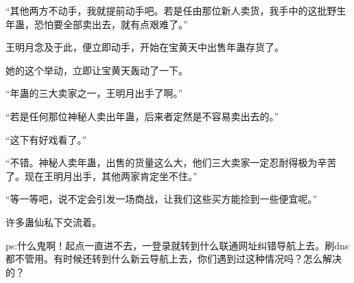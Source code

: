 \begin{this_body}
“其他两方不动手，我就提前动手吧。若是任由那位新人卖货，我手中的这批野生年蛊，恐怕要全部卖出去，就有点艰难了。”

王明月念及于此，便立即动手，开始在宝黄天中出售年蛊存货了。

她的这个举动，立即让宝黄天轰动了一下。

“年蛊的三大卖家之一，王明月出手了啊。”

“若是任何那位神秘人卖出年蛊，后来者定然是不容易卖出去的。”

“这下有好戏看了。”

“不错。神秘人卖年蛊，出售的货量这么大，他们三大卖家一定忍耐得极为辛苦了。现在王明月出手，其他两家肯定坐不住。”

“等一等吧，说不定会引发一场商战，让我们这些买方能捡到一些便宜呢。”

许多蛊仙私下交流着。

ps:什么鬼啊！起点一直进不去，一登录就转到什么联通网址纠错导航上去。刷dns都不管用。有时候还转到什么新云导航上去，你们遇到过这种情况吗？怎么解决的？

\end{this_body}

